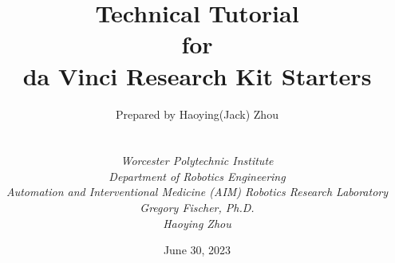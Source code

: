 
\def\Company{Consultancy}
\def\Institute{\textit{Worcester Polytechnic Institute}}
\def\Course{\textit{Department of Robotics Engineering}}
\def\Module{\textit{Automation and Interventional Medicine (AIM) Robotics Research Laboratory}}
\def\Docent{\textit{Gregory Fischer, Ph.D.}}
\def\Assistant{\textit{Haoying Zhou}}

\def\BoldTitle{Technical Tutorial}

\def\Subtitle{for \\ da Vinci Research Kit Starters \\}
\def\Authors{Prepared by Haoying(Jack) Zhou } 
\def\Shortname{Jack}


\title{\textbf{\BoldTitle}\\\Subtitle}
\author{\Authors \\ \\ \\ \Institute\\ \Course\\ \Module\\ \Docent\\ \Assistant}
\date{June 30, 2023}


